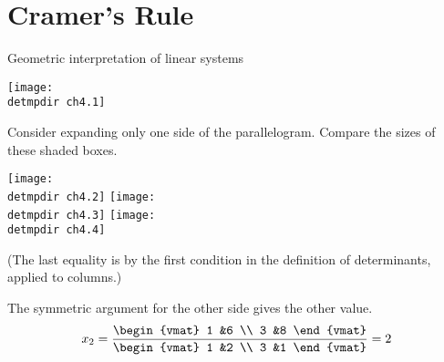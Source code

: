 \section{Cramer's Rule}
\begin{frame}{Geometric interpretation of linear systems}
\begin{center}
 \texttt{[image: \\detmpdir ch4.1]}
\end{center}
\end{frame}
\begin{frame}
Consider expanding only one side of the parallelogram.
Compare the sizes of these shaded boxes.
\begin{center}
   \texttt{[image: \\detmpdir ch4.2]}
   \hfil
   \texttt{[image: \\detmpdir ch4.3]}
   \hfil
   \texttt{[image: \\detmpdir ch4.4]}
\end{center}
\pause
{}
(The last equality is by the first condition in the definition of
determinants, applied to columns.)
\end{frame}
\begin{frame}
\pause
The symmetric argument for the other side gives the other value.
\begin{equation*}
  x_2=
  \frac{
  \begin{vmat}
    1  &6  \\
    3  &8
  \end{vmat}}{
  \begin{vmat}
    1  &2  \\
    3  &1
  \end{vmat}}
  =2
\end{equation*}
\end{frame}


